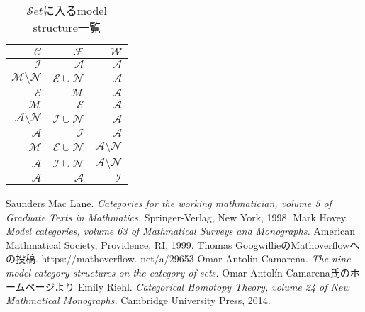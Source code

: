 \documentclass[. /main]{subfiles}
\theoremstyle{definition}
\begin{document}
\begin{table}[hbtp]
\caption{$\mathcal{S}et$に入るmodel structure一覧}
\centering
\begin{tabular}{rrr}
\hline
$\mathcal{C}$ & $\mathcal{F}$ & $\mathcal{W}$ \\
\hline \hline
$\mathcal{I}$ & $\mathcal{A}$ & $\mathcal{A}$\\
$\mathcal{M} \setminus \mathcal{N}$ & $\mathcal{E} \cup \mathcal{N}$ & $\mathcal{A}$\\
$\mathcal{E}$ & $\mathcal{M}$ & $\mathcal{A}$\\
$\mathcal{M}$ & $\mathcal{E}$ & $\mathcal{A}$\\
$\mathcal{A} \setminus \mathcal{N}$ & $\mathcal{I} \cup \mathcal{N}$ & $\mathcal{A}$\\
$\mathcal{A}$ & $\mathcal{I}$ & $\mathcal{A}$\\
$\mathcal{M}$ & $\mathcal{E} \cup \mathcal{N}$ & $\mathcal{A} \setminus \mathcal{N}$\\
$\mathcal{A}$ & $\mathcal{I} \cup \mathcal{N}$ & $\mathcal{A} \setminus \mathcal{N}$\\
$\mathcal{A}$ & $\mathcal{A}$ & $\mathcal{I}$\\
\hline
\end{tabular}
\end{table}
\begin{thebibliography}{9}
 Saunders Mac Lane.  
{\it Categories for the working mathmatician,  volume 5 of Graduate Texts in Mathmatics.}  Springer-Verlag,  New York,  1998. 
 Mark Hovey. 
{\it Model categories,  volume 63 of Mathmatical Surveys and Monographs.}  American Mathmatical Society,  Providence,  RI,  1999. 
 Thomas GoogwillieのMathoverflowへの投稿.  
https://mathoverflow. net/a/29653
 Omar Antolín Camarena. 
{\it The nine model category structures on the category of sets. } Omar Antolín Camarena氏のホームページより
 Emily Riehl. 
{\it Categorical Homotopy Theory,  volume 24 of New Mathmatical Monographs.}  Cambridge University Press,  2014. 

\end{thebibliography}
\end{document}
